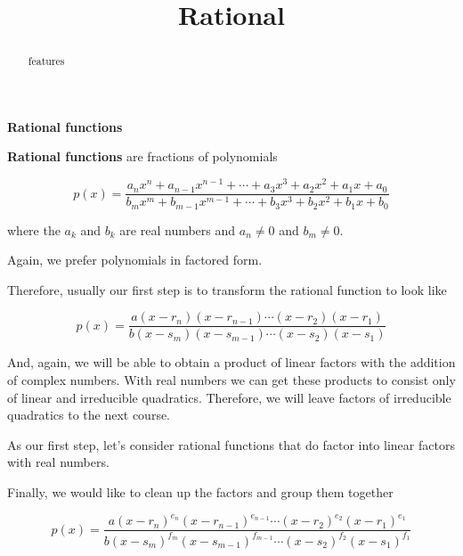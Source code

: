 \documentclass{ximera}
\title{Rational}
\begin{document}
\begin{abstract}
features
\end{abstract}
\maketitle








\begin{idea} \item \textbf{\textcolor{blue!55!black}{Rational functions}}


\textbf{Rational functions} are fractions of polynomials




\[ p(x) =   \frac{ a_n x^n + a_{n-1} x^{n-1} + \cdots + a_3 x^3 + a_2 x^2 + a_1 x + a_0  } { b_m x^m + b_{m-1} x^{m-1} + \cdots + b_3 x^3 + b_2 x^2 + b_1 x + b_0 }   \]



where the $a_k$ and $b_k$ are real numbers and $a_n \ne 0$ and $b_m \ne 0$.


\end{idea}





Again, we prefer polynomials in factored form.  


Therefore, usually our first step is to transform the rational function to look like



\[ p(x) =   \frac{ a (x-r_n)(x-r_{n-1})  \cdots (x-r_2)(x-r_1)  } { b (x-s_m)(x-s_{m-1})  \cdots (x-s_2)(x-s_1) }   \]




And, again, we will be able to obtain a product of linear factors with the addition of complex numbers.  With real numbers we can get these products to consist only of linear and irreducible quadratics.  Therefore, we will leave factors of irreducible quadratics to the next course. 

As our first step, let's consider rational functions that do factor into linear factors with real numbers. 




Finally, we would like to clean up the factors and group them together






\[ p(x) =   \frac{ a (x-r_n)^{e_n} (x-r_{n-1})^{e_{n-1}}  \cdots (x-r_2)^{e_2} (x-r_1)^{e_1}  } { b (x-s_m)^{f_m} (x-s_{m-1})^{f_{m-1}}  \cdots (x-s_2)^{f_2} (x-s_1)^{f_1} }   \]
\end{document}
